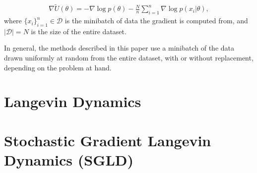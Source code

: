 \documentclass[11pt]{article}
\begin{document}
\begin{align} \label{stochasticgradient}
\nabla \tilde{U}(\theta) = - \nabla \log p(\theta) -\frac{N}{n}\sum_{i=1}^n\nabla \log p(x_{i}|\theta),
\end{align}
where $\{x_i\}_{i=1}^n \in \mathcal{D}$ is the minibatch of data the gradient is computed from, and $|\mathcal{D}| = N$ is the size of the entire dataset. 
\par
In general, the methods described in this paper use a minibatch of the data drawn uniformly at random from the entire dataset, with or without replacement, depending on the problem at hand.


\section{Langevin Dynamics}


\section{Stochastic Gradient Langevin Dynamics (SGLD)}
\end{document}

